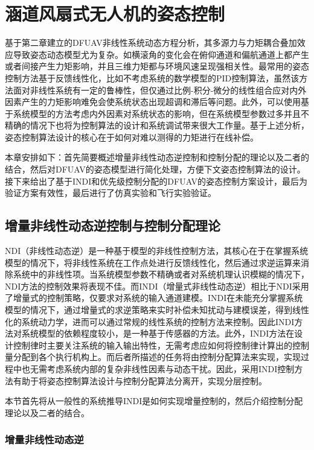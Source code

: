 \chapter{涵道风扇式无人机的姿态控制}

基于第二章建立的DFUAV非线性系统动态方程分析，其多源力与力矩耦合叠加效应导致姿态动态模型尤为复杂。如横滚角的变化会在俯仰通道和偏航通道上都产生或者间接产生力矩影响，并且三维力矩都与环境风速呈现强相关性。最常用的姿态控制方法基于反馈线性化，比如不考虑系统的数学模型的PID控制算法，虽然该方法面对非线性系统有一定的鲁棒性，但仅通过比例-积分-微分的线性组合应对内外因素产生的力矩影响难免会使系统状态出现超调和滞后等问题。此外，可以使用基于系统模型的方法考虑内外因素对系统状态的影响，但在系统模型参数过多并且不精确的情况下也将为控制算法的设计和系统调试带来很大工作量。基于上述分析，姿态控制算法设计的核心在于如何对难以测得的力矩进行在线补偿。

本章安排如下：首先简要概述增量非线性动态逆控制和控制分配的理论以及二者的结合，然后对DFUAV的姿态模型进行简化处理，方便下文姿态控制算法的设计。接下来给出了基于INDI和优先级控制分配的DFUAV的姿态控制方案设计，最后为验证方案有效性，最后进行了仿真实验和飞行实验验证。

\section{增量非线性动态逆控制与控制分配理论}

NDI（非线性动态逆）是一种基于模型的非线性控制方法，其核心在于在掌握系统模型的情况下，将非线性系统在工作点处进行反馈线性化，然后通过求逆运算来消除系统中的非线性项。当系统模型参数不精确或者对系统机理认识模糊的情况下，NDI方法的控制效果将表现不佳。而INDI（增量式非线性动态逆）相比于NDI采用了增量式的控制策略，仅要求对系统的输入通道建模。INDI在未能充分掌握系统模型的情况下，通过增量式的求逆策略来实时补偿未知扰动与建模误差，得到线性化的系统动力学，进而可以通过常规的线性系统的控制方法来控制\cite{wangStabilityAnalysisIncremental2019b}。因此INDI方法对系统模型的依赖程度较小，是一种基于传感器的方法。此外，INDI方法在设计控制律时主要关注系统的输入输出特性，无需考虑应如何将控制律计算出的控制量分配到各个执行机构上。而后者所描述的任务将由控制分配算法来实现，实现过程中也无需考虑系统内部的复杂非线性因素与动态干扰。因此，采用INDI控制方法有助于将姿态控制算法设计与控制分配算法分离开，实现分层控制。

本节首先将从一般性的系统推导INDI是如何实现增量控制的，然后介绍控制分配理论以及二者的结合。

\subsection{增量非线性动态逆}

